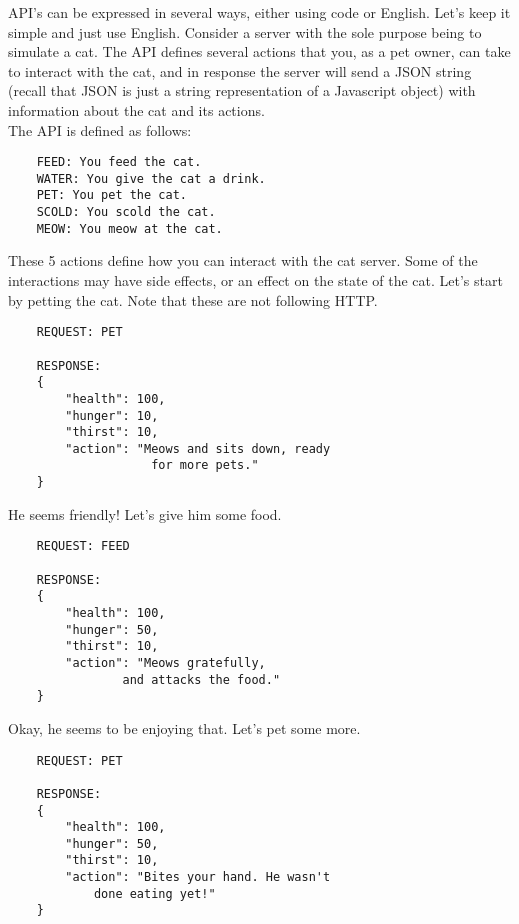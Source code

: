 \begin{kaobox}[title=Let's take a look at an example of a simple API.]
    
    API's can be expressed in several ways, either using code or English. Let's keep it simple and just use English. Consider a server with the sole purpose being to simulate a cat. The API defines several actions that you, as a pet owner, can take to interact with the cat, and in response the server will send a JSON string (recall that JSON is just a string representation of a Javascript object) with information about the cat and its actions. \\

    The API is defined as follows:
    \begin{verbatim}
    FEED: You feed the cat.
    WATER: You give the cat a drink.
    PET: You pet the cat.
    SCOLD: You scold the cat.
    MEOW: You meow at the cat.
    \end{verbatim}

    These 5 actions define how you can interact with the cat server. Some of the interactions may have side effects, or an effect on the state of the cat. Let's start by petting the cat. Note that these are not following HTTP.

    \begin{verbatim}
    REQUEST: PET

    RESPONSE: 
    {
        "health": 100,
        "hunger": 10,
        "thirst": 10,
        "action": "Meows and sits down, ready 
                    for more pets."
    }
    \end{verbatim}

    He seems friendly! Let's give him some food.

    \begin{verbatim}
    REQUEST: FEED

    RESPONSE: 
    {
        "health": 100,
        "hunger": 50,
        "thirst": 10,
        "action": "Meows gratefully, 
                and attacks the food."
    }
    \end{verbatim}

    Okay, he seems to be enjoying that. Let's pet some more.
    \begin{verbatim}
    REQUEST: PET

    RESPONSE: 
    {
        "health": 100,
        "hunger": 50,
        "thirst": 10,
        "action": "Bites your hand. He wasn't 
            done eating yet!"
    }
    \end{verbatim}


\end{kaobox}
